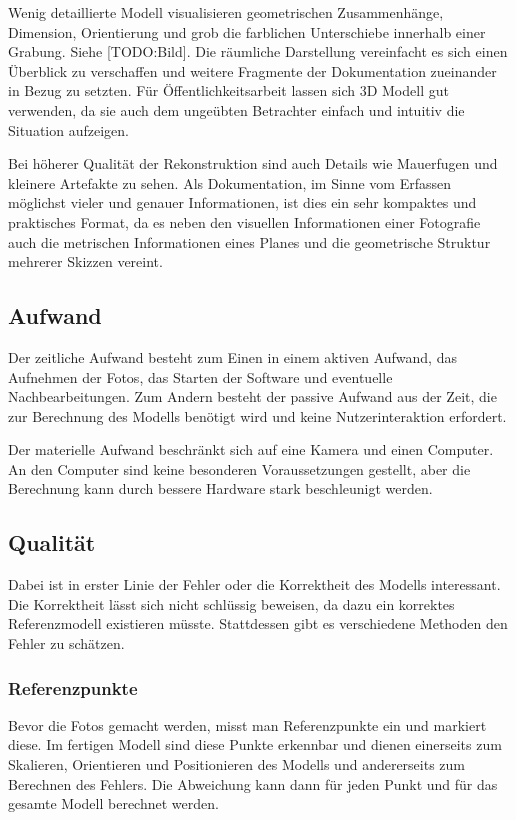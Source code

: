 			Wenig detaillierte Modell visualisieren geometrischen Zusammenhänge, Dimension, Orientierung und grob die farblichen Unterschiebe innerhalb einer Grabung. Siehe [TODO:Bild]. Die räumliche Darstellung vereinfacht es sich einen Überblick zu verschaffen und weitere Fragmente der Dokumentation zueinander in Bezug zu setzten.
			Für Öffentlichkeitsarbeit lassen sich 3D Modell gut verwenden, da sie auch dem ungeübten Betrachter einfach und intuitiv die Situation aufzeigen.
			
			Bei höherer Qualität der Rekonstruktion sind auch Details wie Mauerfugen und kleinere Artefakte zu sehen. Als Dokumentation, im Sinne vom Erfassen möglichst vieler und genauer Informationen, ist dies ein sehr kompaktes und praktisches Format, da es neben den visuellen Informationen einer Fotografie auch die metrischen Informationen eines Planes und die geometrische Struktur mehrerer Skizzen vereint. 
			
		\subsection{Aufwand}
			Der zeitliche Aufwand besteht zum Einen in einem aktiven Aufwand, das Aufnehmen der Fotos, das Starten der Software und eventuelle Nachbearbeitungen. Zum Andern besteht der passive Aufwand aus der Zeit, die zur Berechnung des Modells benötigt wird und keine Nutzerinteraktion erfordert.
			
			Der materielle Aufwand beschränkt sich auf eine Kamera und einen Computer. An den Computer sind keine besonderen Voraussetzungen gestellt, aber die Berechnung kann durch bessere Hardware stark beschleunigt werden.

		\subsection{Qualität}
			Dabei ist in erster Linie der Fehler oder die Korrektheit des Modells interessant. Die Korrektheit lässt sich nicht schlüssig beweisen, da dazu ein korrektes Referenzmodell existieren müsste.
			Stattdessen gibt es verschiedene Methoden den Fehler zu schätzen.
			
			\subsubsection{Referenzpunkte}
				Bevor die Fotos gemacht werden, misst man Referenzpunkte ein und markiert diese. Im fertigen Modell sind diese Punkte erkennbar und dienen einerseits zum Skalieren, Orientieren und Positionieren des Modells und andererseits zum Berechnen des Fehlers. Die Abweichung kann dann für jeden Punkt und für das gesamte Modell berechnet werden.
				
